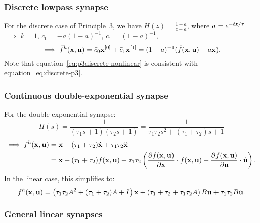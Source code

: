 \subsubsection{Discrete lowpass synapse}

For the discrete case of Principle~3, we have $H(z) = \frac{1 - a}{z - a}$, where $a = e^{-\texttt{dt}{} / \tau}$ $\implies$ $k = 1$, $\bar{c}_0 = -a(1 - a)^{-1}$, $\bar{c}_1 = (1 - a)^{-1}$,
\begin{equation} \label{eq:p3discrete-nonlinear}
\implies \bar{f}^h(\mathbf{x}, \mathbf{u}) = \bar{c}_0 \mathbf{x}^{[0]} + \bar{c}_1 \mathbf{x}^{[1]} =  (1 - a)^{-1}(\bar{f}(\mathbf{x}, \mathbf{u}) - a\mathbf{x}) \text{.}
\end{equation}
Note that equation~\ref{eq:p3discrete-nonlinear} is consistent with equation~\ref{eq:discrete-p3}.

\subsubsection{Continuous double-exponential synapse}

For the double exponential synapse:
\begin{equation} \label{eq:double-exp}
H(s) = \frac{1}{(\tau_1 s + 1)(\tau_2 s + 1)} = \frac{1}{\tau_1 \tau_2 s^2 + (\tau_1 + \tau_2)s + 1}
\end{equation}
\begin{align} \label{eq:double-exp-solution}
\implies f^h(\mathbf{x}, \mathbf{u}) &= \mathbf{x} + (\tau_1 + \tau_2) \dot{\mathbf{x}} + \tau_1 \tau_2 \ddot{\mathbf{x}} \nonumber \\
&= \mathbf{x} + (\tau_1 + \tau_2) f(\mathbf{x}, \mathbf{u}) + \tau_1 \tau_2 \left( \frac{\partial f(\mathbf{x}, \mathbf{u})}{\partial \mathbf{x}} \cdot f(\mathbf{x}, \mathbf{u}) + \frac{\partial f(\mathbf{x}, \mathbf{u})}{\partial \mathbf{u}} \cdot \dot{\mathbf{u}} \right) \text{.}
\end{align}
In the linear case, this simplifies to:
\begin{align*}
f^h(\mathbf{x}, \mathbf{u}) = \left( \tau_1 \tau_2 A^2 + (\tau_1 + \tau_2) A + I \right) \mathbf{x} + \left( \tau_1 + \tau_2 + \tau_1 \tau_2 A \right) B \mathbf{u} + \tau_1 \tau_2 B \dot{\mathbf{u}} \text{.}
\end{align*}

\subsubsection{General linear synapses}

